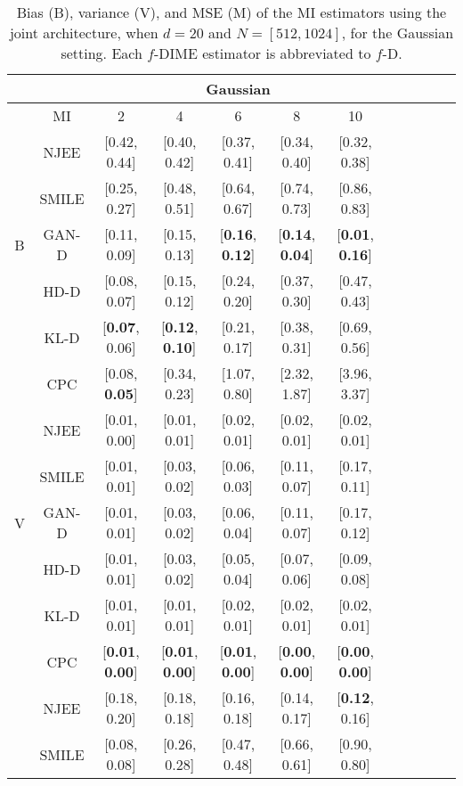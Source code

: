 \begin{table}
\caption{Bias (B), variance (V), and MSE (M) of the MI estimators using the joint architecture, when $d=20$ and $N=[512, 1024]$, for the Gaussian setting. Each $f$-DIME estimator is abbreviated to $f$-D.}
\setlength{\arrayrulewidth}{0.5mm}
\centering
    \begin{tabular}{ |c|c|c c c c c|c c c c c| } 
     \hline
     & & \multicolumn{5}{|c|}{Gaussian} \\
     \hline
     & MI & 2 & 4 & 6 & 8 & 10 \\
     \hline
      & NJEE & [0.42, 0.44] & [0.40, 0.42] & [0.37, 0.41] & [0.34, 0.40] & [0.32, 0.38] \\
      & SMILE & [0.25, 0.27] & [0.48, 0.51] & [0.64, 0.67] & [0.74, 0.73] & [0.86, 0.83]\\
      B & GAN-D & [0.11, 0.09] & [0.15, 0.13] & [\textbf{0.16}, \textbf{0.12}] & [\textbf{0.14}, \textbf{0.04}] & [\textbf{0.01}, \textbf{0.16}] \\
      & HD-D & [0.08, 0.07] & [0.15, 0.12] & [0.24, 0.20] & [0.37, 0.30] & [0.47, 0.43]  \\
      & KL-D & [\textbf{0.07}, 0.06] & [\textbf{0.12}, \textbf{0.10}] & [0.21, 0.17] & [0.38, 0.31] & [0.69, 0.56] \\
      & CPC & [0.08, \textbf{0.05}] & [0.34, 0.23] & [1.07, 0.80] & [2.32, 1.87] & [3.96, 3.37] \\
     \hline
     & NJEE & [0.01, 0.00] & [0.01, 0.01] & [0.02, 0.01] & [0.02, 0.01] & [0.02, 0.01] \\
      & SMILE & [0.01, 0.01] & [0.03, 0.02] & [0.06, 0.03] & [0.11, 0.07] & [0.17, 0.11]  \\
      V & GAN-D & [0.01, 0.01] & [0.03, 0.02] & [0.06, 0.04] & [0.11, 0.07] & [0.17, 0.12] \\
      & HD-D & [0.01, 0.01] & [0.03, 0.02] & [0.05, 0.04] & [0.07, 0.06] & [0.09, 0.08]  \\
      & KL-D& [0.01, 0.01] & [0.01, 0.01] & [0.02, 0.01] & [0.02, 0.01] & [0.02, 0.01] \\
      & CPC & [\textbf{0.01}, \textbf{0.00}] & [\textbf{0.01}, \textbf{0.00}] & [\textbf{0.01}, \textbf{0.00}] & [\textbf{0.00}, \textbf{0.00}] & [\textbf{0.00}, \textbf{0.00}]  \\
     \hline
     & NJEE & [0.18, 0.20] & [0.18, 0.18] & [0.16, 0.18] & [0.14, 0.17] & [\textbf{0.12}, 0.16]  \\
      & SMILE & [0.08, 0.08] & [0.26, 0.28] & [0.47, 0.48] & [0.66, 0.61] & [0.90, 0.80] \\

\end{tabular}
\end{table}
